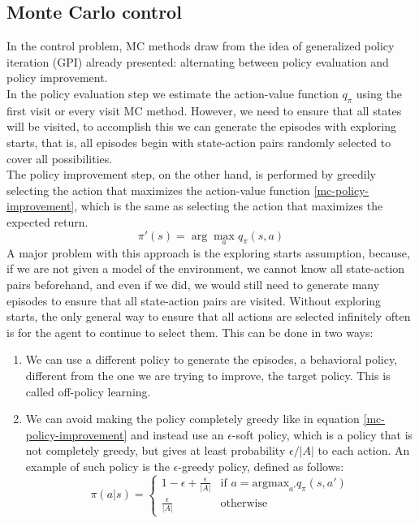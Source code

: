 \subsection{Monte Carlo control}
In the control problem, MC methods draw from the idea of generalized policy iteration (GPI) already presented: alternating between policy evaluation and policy improvement.\\
In the policy evaluation step we estimate the action-value function $q_{\pi}$ using the first visit or every visit MC method. However, we need to ensure that all states will be visited, to accomplish this we can generate the episodes with exploring starts, that is, all episodes begin with state-action pairs randomly selected to cover all possibilities.\\
The policy improvement step, on the other hand, is performed by greedily selecting the action that maximizes the action-value function \eqref{mc-policy-improvement}, which is the same as selecting the action that maximizes the expected return.
\begin{equation}
    \pi'(s) = \arg \max_a q_{\pi}(s, a)
    \label{mc-policy-improvement}
\end{equation}
A major problem with this approach is the exploring starts assumption, because, if we are not given a model of the environment, we cannot know all state-action pairs beforehand, and even if we did, we would still need to generate many episodes to ensure that all state-action pairs are visited. Without exploring starts, the only general way to ensure that all actions are selected infinitely often is for the agent to continue to select them. This can be done in two ways:
\begin{enumerate}
    \item We can use a different policy to generate the episodes, a behavioral policy, different from the one we are trying to improve, the target policy. This is called off-policy learning.
    \item We can avoid making the policy completely greedy like in equation \eqref{mc-policy-improvement} and instead use an $\epsilon$-soft policy, which is a policy that is not completely greedy, but gives at least probability $\epsilon / |A|$ to each action. An example of such policy is the $\epsilon$-greedy policy, defined as follows:
    \begin{equation}
        \pi(a|s) = \begin{cases}
            1 - \epsilon + \frac{\epsilon}{|A|} & \text{if } a = \mathrm{argmax}_{a'} q_{\pi}(s, a') \\
            \frac{\epsilon}{|A|} & \text{otherwise}
        \end{cases}
        \label{epsilon-greedy-policy}
    \end{equation}
\end{enumerate}

